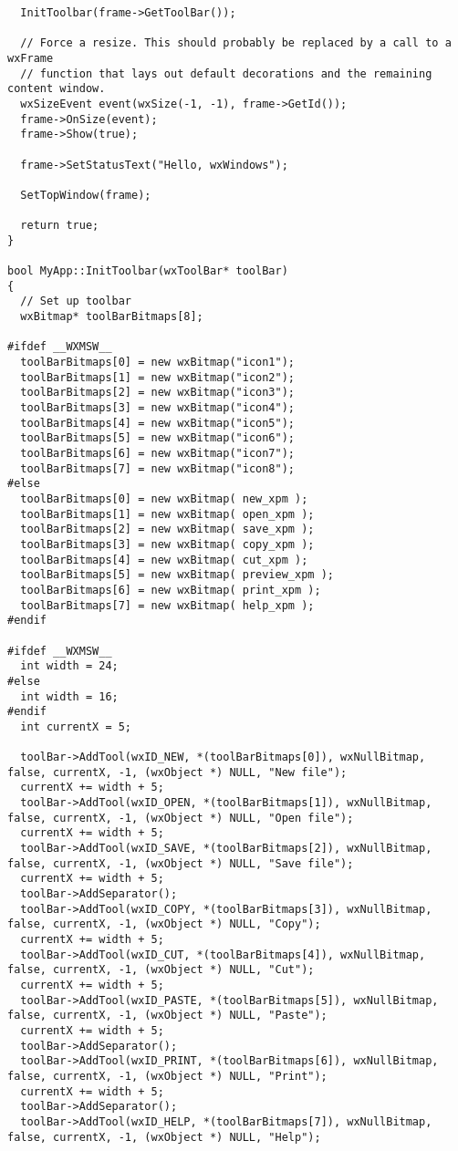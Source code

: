 {\begin{verbatim}
  InitToolbar(frame->GetToolBar());

  // Force a resize. This should probably be replaced by a call to a wxFrame
  // function that lays out default decorations and the remaining content window.
  wxSizeEvent event(wxSize(-1, -1), frame->GetId());
  frame->OnSize(event);
  frame->Show(true);

  frame->SetStatusText("Hello, wxWindows");
  
  SetTopWindow(frame);

  return true;
}

bool MyApp::InitToolbar(wxToolBar* toolBar)
{
  // Set up toolbar
  wxBitmap* toolBarBitmaps[8];

#ifdef __WXMSW__
  toolBarBitmaps[0] = new wxBitmap("icon1");
  toolBarBitmaps[1] = new wxBitmap("icon2");
  toolBarBitmaps[2] = new wxBitmap("icon3");
  toolBarBitmaps[3] = new wxBitmap("icon4");
  toolBarBitmaps[4] = new wxBitmap("icon5");
  toolBarBitmaps[5] = new wxBitmap("icon6");
  toolBarBitmaps[6] = new wxBitmap("icon7");
  toolBarBitmaps[7] = new wxBitmap("icon8");
#else
  toolBarBitmaps[0] = new wxBitmap( new_xpm );
  toolBarBitmaps[1] = new wxBitmap( open_xpm );
  toolBarBitmaps[2] = new wxBitmap( save_xpm );
  toolBarBitmaps[3] = new wxBitmap( copy_xpm );
  toolBarBitmaps[4] = new wxBitmap( cut_xpm );
  toolBarBitmaps[5] = new wxBitmap( preview_xpm );
  toolBarBitmaps[6] = new wxBitmap( print_xpm );
  toolBarBitmaps[7] = new wxBitmap( help_xpm );
#endif

#ifdef __WXMSW__
  int width = 24;
#else
  int width = 16;
#endif
  int currentX = 5;

  toolBar->AddTool(wxID_NEW, *(toolBarBitmaps[0]), wxNullBitmap, false, currentX, -1, (wxObject *) NULL, "New file");
  currentX += width + 5;
  toolBar->AddTool(wxID_OPEN, *(toolBarBitmaps[1]), wxNullBitmap, false, currentX, -1, (wxObject *) NULL, "Open file");
  currentX += width + 5;
  toolBar->AddTool(wxID_SAVE, *(toolBarBitmaps[2]), wxNullBitmap, false, currentX, -1, (wxObject *) NULL, "Save file");
  currentX += width + 5;
  toolBar->AddSeparator();
  toolBar->AddTool(wxID_COPY, *(toolBarBitmaps[3]), wxNullBitmap, false, currentX, -1, (wxObject *) NULL, "Copy");
  currentX += width + 5;
  toolBar->AddTool(wxID_CUT, *(toolBarBitmaps[4]), wxNullBitmap, false, currentX, -1, (wxObject *) NULL, "Cut");
  currentX += width + 5;
  toolBar->AddTool(wxID_PASTE, *(toolBarBitmaps[5]), wxNullBitmap, false, currentX, -1, (wxObject *) NULL, "Paste");
  currentX += width + 5;
  toolBar->AddSeparator();
  toolBar->AddTool(wxID_PRINT, *(toolBarBitmaps[6]), wxNullBitmap, false, currentX, -1, (wxObject *) NULL, "Print");
  currentX += width + 5;
  toolBar->AddSeparator();
  toolBar->AddTool(wxID_HELP, *(toolBarBitmaps[7]), wxNullBitmap, false, currentX, -1, (wxObject *) NULL, "Help");


\end{verbatim}}
